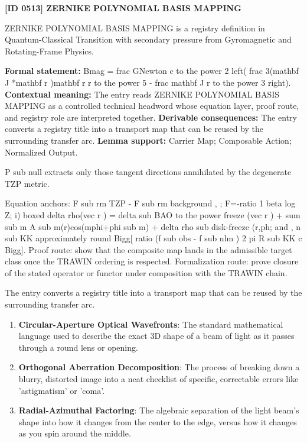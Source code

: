 \clearpage
\noindent\textbf{[ID 0513] ZERNIKE POLYNOMIAL BASIS MAPPING}\par
\vspace{0.35em}
\begingroup\small
{}
ZERNIKE POLYNOMIAL BASIS MAPPING is a registry definition in Quantum-Classical Transition with secondary pressure from Gyromagnetic and Rotating-Frame Physics.

\begingroup\footnotesize\setlength{\emergencystretch}{3em}\sloppy
\textbf{Formal statement:} Bmag = frac GNewton c to the power 2 left( frac 3(mathbf J *mathbf r )mathbf r r to the power 5 - frac mathbf J r to the power 3 right). \textbf{Contextual meaning:} The entry reads ZERNIKE POLYNOMIAL BASIS MAPPING as a controlled technical headword whose equation layer, proof route, and registry role are interpreted together. \textbf{Derivable consequences:} The entry converts a registry title into a transport map that can be reused by the surrounding transfer arc. \textbf{Lemma support:} Carrier Map; Composable Action; Normalized Output.\par
\endgroup

P sub null extracts only those tangent directions annihilated by the degenerate TZP metric.

Equation anchors: F sub rm TZP - F sub rm background , ; F=-ratio 1 beta log Z; i) boxed delta rho(vec r ) = delta sub BAO to the power freeze (vec r ) + sum sub m A sub m(r)cos(mphi+phi sub m) + delta rho sub disk-freeze (r,ph; and , n sub KK approximately round Bigg[ ratio (f sub obs - f sub nlm ) 2 pi R sub KK c Bigg]. Proof route: show that the composite map lands in the admissible target class once the TRAWIN ordering is respected. Formalization route: prove closure of the stated operator or functor under composition with the TRAWIN chain.

The entry converts a registry title into a transport map that can be reused by the surrounding transfer arc.
\endgroup

\begin{enumerate}[leftmargin=1.6em,itemsep=6pt,topsep=4pt]
\item \textbf{Circular-Aperture Optical Wavefronts}: The standard mathematical language used to describe the exact 3D shape of a beam of light as it passes through a round lens or opening.
\item \textbf{Orthogonal Aberration Decomposition}: The process of breaking down a blurry, distorted image into a neat checklist of specific, correctable errors like 'astigmatism' or 'coma'.
\item \textbf{Radial-Azimuthal Factoring}: The algebraic separation of the light beam's shape into how it changes from the center to the edge, versus how it changes as you spin around the middle.
\end{enumerate}

